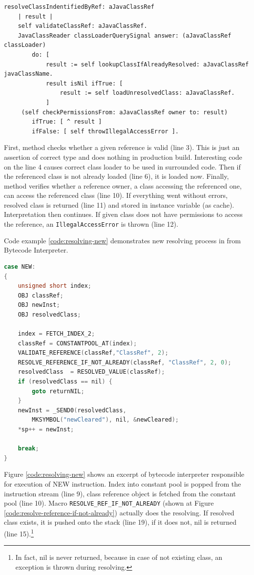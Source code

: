 \documentclass[11pt,twoside,a4paper]{book}
\begin{document}
\begin{lstlisting}[caption=Class reference resolving, label=code:class-ref-resolving]
resolveClassIndentifiedByRef: aJavaClassRef
    | result |
    self validateClassRef: aJavaClassRef.
    JavaClassReader classLoaderQuerySignal answer: (aJavaClassRef classLoader)
        do: [
            result := self lookupClassIfAlreadyResolved: aJavaClassRef javaClassName.
			result isNil ifTrue: [
                result := self loadUnresolvedClass: aJavaClassRef.
            ] 
     (self checkPermissionsFrom: aJavaClassRef owner to: result)
        ifTrue: [ ^ result ] 
		ifFalse: [ self throwIllegalAccessError ].
\end{lstlisting}

First, method checks whether a given reference is valid (line 3).
This is just an assertion of correct type and does nothing in production build.
Interesting code on the line 4 causes correct class loader to be used in surrounded code.
Then if the referenced class is not already loaded (line 6), it is loaded now.
Finally, method verifies whether a reference owner, a class accessing the referenced one, can access the referenced class (line 10).
If everything went without errors, resolved class is returned (line 11) and stored in instance variable (as cache).
Interpretation then continues.
If given class does not have permissions to access the reference, an \texttt{IllegalAccessError} is thrown (line 12).

Code example \ref{code:resolving-new} demonstrates new resolving process in from Bytecode Interpreter. 

\begin{lstlisting}[language=C, caption=Resolving example shown in NEW instruction, label=code:resolving-new]
case NEW:
{
    unsigned short index;
    OBJ classRef;
    OBJ newInst;
    OBJ resolvedClass;

    index = FETCH_INDEX_2;
    classRef = CONSTANTPOOL_AT(index);
    VALIDATE_REFERENCE(classRef,"ClassRef", 2);
    RESOLVE_REFERENCE_IF_NOT_ALREADY(classRef, "ClassRef", 2, 0);
    resolvedClass  = RESOLVED_VALUE(classRef);
    if (resolvedClass == nil) {
        goto returnNIL;
    }
    newInst = _SEND0(resolvedClass, 
    	MKSYMBOL("newCleared"), nil, &newCleared);
    *sp++ = newInst;

    break;
}
\end{lstlisting}

Figure \ref{code:resolving-new} shows an excerpt of bytecode interpreter responsible for execution of NEW instruction.
Index into constant pool is popped from the instruction stream (line 9), class reference object is fetched from the constant pool (line 10).
Macro \texttt{RESOLVE\_REF\_IF\_NOT\_ALREADY} (shown at Figure \ref{code:resolve-reference-if-not-already}) actually does the 
resolving. 
If resolved class exists, it is pushed onto the stack (line 19), if it does not, nil is returned (line 15).\footnote{In fact, nil is never returned, because in case of not existing class, an exception is thrown during resolving.}
\end{document}
